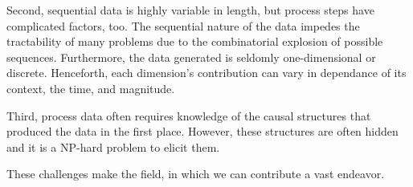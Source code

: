 \documentclass[./../../paper.tex]{subfiles}
\begin{document}
Second, sequential data is highly variable in length, but process steps have complicated factors, too. The sequential nature of the data impedes the tractability of many problems due to the combinatorial explosion of possible sequences. 
Furthermore, the data generated is seldomly one-dimensional or discrete. Henceforth, each dimension's contribution can vary in dependance of its context, the time, and magnitude. 

Third, process data often requires knowledge of the causal structures that produced the data in the first place. However, these structures are often hidden and it is a NP-hard problem to elicit them\autocite{wang_Efficientrecoverymissing_2013}.

These challenges make the field, in which we can contribute a vast endeavor. 
\end{document}
